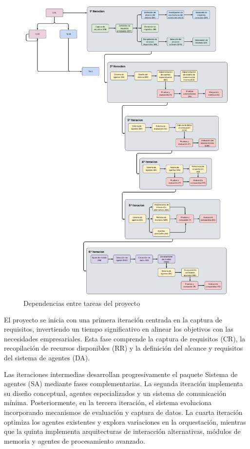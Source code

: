\begin{figure}[h]
  \centering
  \includegraphics[scale=0.165]{figures/dependencias_2.png}%
  \caption{Dependencias entre tareas del proyecto}
  \label{fig:dependencias}
\end{figure}

El proyecto se inicia con una primera iteración centrada en la captura de requisitos, invertiendo un tiempo significativo en alinear los objetivos con las necesidades empresariales. Esta fase comprende la captura de requisitos (CR), la recopilación de recursos disponibles (RR) y la definición del alcance y requisitos del sistema de agentes (DA).

Las iteraciones intermedias desarrollan progresivamente el paquete Sistema de agentes (SA) mediante fases complementarias. La segunda iteración implementa su diseño conceptual, agentes especializados y un sistema de comunicación mínima. Posteriormente, en la tercera iteración, el sistema evoluciona incorporando mecanismos de evaluación y captura de datos. La cuarta iteración optimiza los agentes existentes y explora variaciones en la orquestación, mientras que la quinta implementa arquitecturas de interacción alternativas, módulos de memoria y agentes de procesamiento avanzado.

